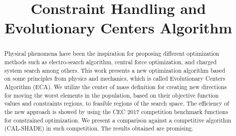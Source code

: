 \documentclass[conference]{IEEEtran}
\begin{document}
\title{Constraint Handling and Evolutionary Centers Algorithm\\
}


\author{
\and
{}
}

\maketitle

\begin{abstract}
Physical phenomena have been the inspiration for proposing different
optimization methods such as electro-search algorithm, central force 
optimization, and charged system search among others. This work presents a new 
optimization algorithm based on some principles from physics and
mechanics, which is called Evolutionary Centers Algorithm (ECA). We utilize 
the center of mass definition for creating new directions for moving the worst 
elements in the population,  based on their objective function values and constraints 
regions, to feasible regions of the search space.  The efficiency of the new 
approach is showed by using the CEC 2017 competition benchmark functions for 
constrained optimization. We present a comparison against a competitive algorithm 
(CAL-SHADE)  in such competition.  The results obtained are promising.
\end{abstract}
\end{document}
